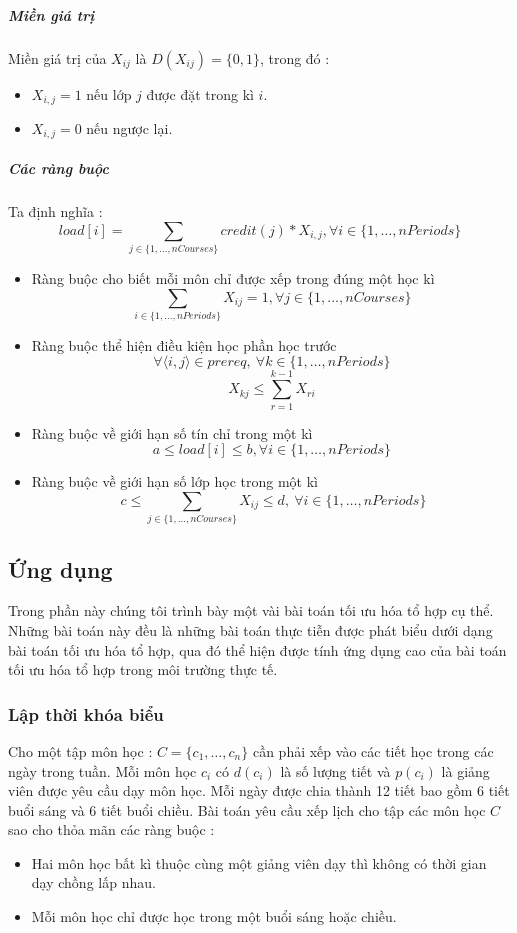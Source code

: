 \documentclass[a4paper,12pt]{report}
\begin{document}
\subparagraph{Miền giá trị}
Miền giá trị của $X_{ij}$ là $D(X_{ij})=\{0,1\}$, trong đó :
\begin{itemize}
\item $X_{i,j}=1$ nếu lớp $j$ được đặt trong kì $i$.
\item $X_{i,j}=0$ nếu ngược lại. 
\end{itemize}
\subparagraph{Các ràng buộc}
Ta định nghĩa : $$load[i]=\sum_{j \in \{1,\dots,nCourses\} } credit(j) *X_{i,j}   ,\forall i \in \{1,\dots,nPeriods\}$$
\begin{itemize}
\item Ràng buộc cho biết mỗi môn chỉ được xếp trong đúng một học kì
$$   \sum_{i \in \{1,\dots,nPeriods\} } X_{ij}=1,\forall j \in\{1,\dots,nCourses\}  $$

\item Ràng buộc thể hiện điều kiện học phần học trước $$ \forall\langle i,j\rangle \in prereq, \ \forall k \in \{1,\dots,nPeriods\} $$
$$X_{kj} \leq \sum^{k-1}_{r=1} X_{ri} $$ 
\item Ràng buộc về giới hạn số tín chỉ trong một kì $$a \leq load[i] \leq b, \forall i \in \{1,\dots,nPeriods\}$$
\item Ràng buộc về giới hạn số lớp học trong một kì $$ \ c \leq \sum_{j \in \{1,\dots,nCourses\}} X_{ij} \leq d , \ \forall i \in \{1,\dots,nPeriods\} $$
\end{itemize}
\subsection{Ứng dụng}
Trong phần này chúng tôi trình bày một vài bài toán tối ưu hóa tổ hợp cụ thể. Những bài toán này đều là những bài toán thực tiễn được phát biểu dưới dạng bài toán tối ưu hóa tổ hợp, qua đó thể hiện được tính ứng dụng cao của bài toán tối ưu hóa tổ hợp trong môi trường thực tế.
\subsubsection{Lập thời khóa biểu}
Cho một tập môn học : $C=\{c_1,\ldots, c_n\}$ cần phải xếp vào các tiết học trong các ngày trong tuần. Mỗi môn học $c_i$ có $d(c_i)$ là số lượng tiết và $p(c_i)$ là giảng viên được yêu cầu dạy môn học. Mỗi ngày được chia thành 12 tiết bao gồm 6 tiết buổi sáng và 6 tiết buổi chiều. Bài toán yêu cầu xếp lịch cho tập các môn học $C$ sao cho thỏa mãn các ràng buộc : \begin{itemize}
\item Hai môn học bất kì thuộc cùng một giảng viên dạy thì không có thời gian dạy chồng lấp nhau.
\item Mỗi môn học chỉ được học trong một buổi sáng hoặc chiều.
\end{itemize}
\end{document}

